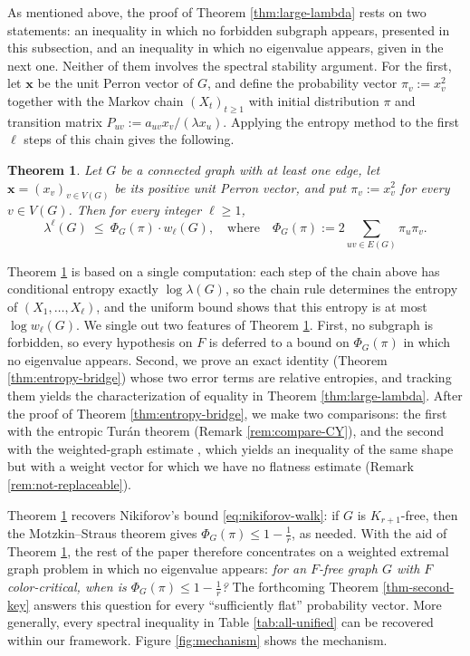 \documentclass[11pt, a4paper]{article}
\newtheorem{theorem}{Theorem}[section]
\theoremstyle{definition}
\theoremstyle{plain}
\renewcommand{\le}{\leqslant}
\renewcommand{\ge}{\geqslant}
\begin{document}
\label{subsec:bridge}

As mentioned above, the proof of Theorem \ref{thm:large-lambda} rests on two
statements: an inequality in which no forbidden subgraph appears, presented in
this subsection, and an inequality in which no eigenvalue appears, given in the next one. 
Neither of them involves the spectral stability argument.  
For the first, let $\bm{x}$ be the unit Perron
vector of $G$, and define the
probability vector $\pi_v:=x_v^{2}$ together with
 the Markov chain
$(X_t)_{t\ge 1}$ with initial distribution $\pi$ and
transition matrix $P_{uv}:=a_{uv}x_v/(\lambda x_u)$. 
Applying the entropy method to
the first $\ell$ steps of this chain gives the following. 



\begin{theorem} 
\label{thm:bridge-intro}
Let $G$ be a connected graph with at least one edge, let $\bm{x}=(x_v)_{v\in V(G)}$ be its
positive unit Perron vector, and put $\pi_v:=x_v^{2}$ for every $v\in V(G)$. Then for every integer
$\ell \ge 1$,
\[
  \lambda^{\ell}(G)\ \le\ \Phi_G(\pi )\cdot w_\ell (G),
  \quad\text{where}\quad
  \Phi_G(\pi ):=2\!\!\sum_{uv\in E(G)}\!\!\pi_u\pi_v .
\]
\end{theorem}


Theorem \ref{thm:bridge-intro} is based on a single
computation: each step of the chain above has conditional entropy exactly $\log \lambda (G)$, so the chain rule determines the entropy of $(X_1,\ldots ,X_\ell )$, and the uniform bound shows that 
 this entropy is at most $\log w_\ell (G)$. We single out two features of Theorem \ref{thm:bridge-intro}. 
First, no subgraph is forbidden, 
so every hypothesis on $F$ is deferred to a bound on
$\Phi_G(\pi )$ in which no eigenvalue appears. Second,   we prove an exact identity (Theorem \ref{thm:entropy-bridge}) whose two error terms are relative entropies, and tracking them yields the characterization of equality in Theorem \ref{thm:large-lambda}. 
After the proof of Theorem \ref{thm:entropy-bridge}, we  make two comparisons: the first with the entropic Tur\'{a}n theorem \cite{CY2026} (Remark \ref{rem:compare-CY}), and the second with the weighted-graph estimate \cite{LSWW2026}, which yields an inequality of the same shape but with a weight vector for which we have no flatness estimate (Remark \ref{rem:not-replaceable}).


\smallskip 
Theorem \ref{thm:bridge-intro} recovers Nikiforov's bound \eqref{eq:nikiforov-walk}: if $G$ is
$K_{r+1}$-free, then the Motzkin--Straus theorem \cite{MS1965} gives
$\Phi_G(\pi )\le 1-\frac1r$, as needed. 
With the aid of Theorem \ref{thm:bridge-intro}, 
the rest of the paper therefore concentrates 
on a weighted extremal graph problem in which no eigenvalue appears: \textit{for
an $F$-free graph $G$ with $F$ color-critical, when is $\Phi_G(\pi )\le 1-\frac1r$?} 
The forthcoming Theorem \ref{thm-second-key} answers this question for every ``sufficiently flat'' probability vector. 
 More generally, every spectral inequality in Table \ref{tab:all-unified} can be recovered within our framework. 
 Figure \ref{fig:mechanism} shows the mechanism.
\end{document}
